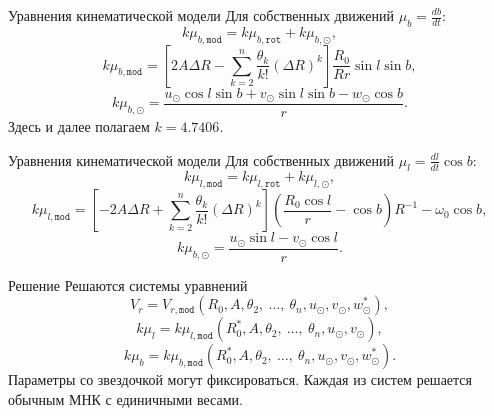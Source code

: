 \documentclass{beamer}
\begin{document}
\begin{frame}{Уравнения кинематической модели}
Для собственных движений $\mu_b = \frac{db}{dt}$:
	\begin{equation}
		k\mu_{b, \texttt{mod}} = k\mu_{b, \texttt{rot}} + k\mu_{b, \odot},
	\end{equation}
	\begin{equation}
		k\mu_{b, \texttt{mod}} = \left[ 2A\Delta R - \sum^n_{k = 2} \frac{\theta_k}{k!} \left( \Delta R \right)^k \right] \frac{R_0}{Rr} \sin{l} \sin{b},
	\end{equation}
	\begin{equation}
                k\mu_{b, \odot} = \frac{u_{\odot}\cos{l}\sin{b} + v_{\odot}\sin{l}\sin{b} - w_{\odot}\cos{b}}{r}.
	\end{equation}
        Здесь и далее полагаем $k=4.7406$.
\end{frame}

\begin{frame}{Уравнения кинематической модели}
Для собственных движений $\mu_l = \frac{dl}{dt}\cos{b}$:
	\begin{equation}
		k\mu_{l, \texttt{mod}} = k\mu_{l, \texttt{rot}} + k\mu_{l, \odot},
	\end{equation}
	\begin{equation}
                k\mu_{l, \texttt{mod}} = \left[ -2A\Delta R + \sum^n_{k = 2} \frac{\theta_k}{k!} \left( \Delta R \right)^k \right] \left( \frac{R_0\cos{l}}{r} - \cos{b} \right) R^{-1} - \omega_0 \cos{b},
	\end{equation}
	\begin{equation}
                k\mu_{b, \odot} = \frac{u_{\odot}\sin{l}- v_{\odot}\cos{l}}{r}.
	\end{equation}
\end{frame}

\begin{frame}{Решение}
	Решаются системы уравнений
	\begin{equation}
                V_r = V_{r, \texttt{mod}} (R_0, A, \theta_2, \:\ldots,\: \theta_n, u_{\odot}, v_{\odot}, w_{\odot}^{*}),
	\end{equation}
	\begin{equation}
                k\mu_l = k\mu_{l, \texttt{mod}} (R_0^{*}, A, \theta_2, \:\ldots,\: \theta_n, u_{\odot}, v_{\odot}),
	\end{equation}
	\begin{equation}
                k\mu_b = k\mu_{b, \texttt{mod}} (R_0^{*}, A, \theta_2, \:\ldots,\: \theta_n, u_{\odot}, v_{\odot}, w_{\odot}^{*}).
	\end{equation}
        Параметры со звездочкой могут фиксироваться. Каждая из систем решается обычным МНК с единичными весами.
\end{frame}
\end{document}
